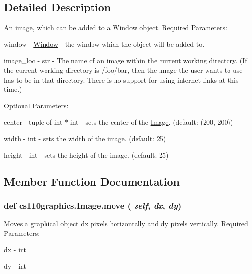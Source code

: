 \subsection{Detailed Description}
An image, which can be added to a \hyperlink{classcs110graphics_1_1Window}{Window} object. Required Parameters:
\begin{DoxyItemize}
\item window -\/ \hyperlink{classcs110graphics_1_1Window}{Window} -\/ the window which the object will be added to.
\item image\_\-loc -\/ str -\/ The name of an image within the current working directory. (If the current working directory is /foo/bar, then the image the user wants to use has to be in that directory. There is no support for using internet links at this time.)
\end{DoxyItemize}

Optional Parameters:
\begin{DoxyItemize}
\item center -\/ tuple of int $\ast$ int -\/ sets the center of the \hyperlink{classcs110graphics_1_1Image}{Image}. (default: (200, 200))
\item width -\/ int -\/ sets the width of the image. (default: 25)
\item height -\/ int -\/ sets the height of the image. (default: 25) 
\end{DoxyItemize}

\subsection{Member Function Documentation}
\hypertarget{classcs110graphics_1_1Image_a540d48247976343a91c610009a9af8cd}{
\subsubsection[{move}]{\setlength{\rightskip}{0pt plus 5cm}def cs110graphics.Image.move ( {\em self}, \/   {\em dx}, \/   {\em dy})}}
\label{classcs110graphics_1_1Image_a540d48247976343a91c610009a9af8cd}


Moves a graphical object dx pixels horizontally and dy pixels vertically. Required Parameters:
\begin{DoxyItemize}
\item dx -\/ int
\item dy -\/ int 
\end{DoxyItemize}

